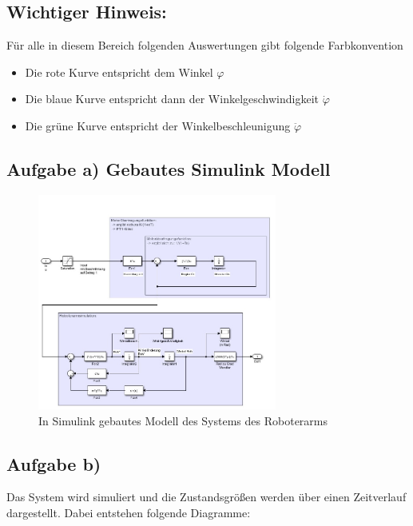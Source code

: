 \documentclass[10pt]{scrartcl}
\begin{document}
\subsection{Wichtiger Hinweis:}
Für alle in diesem Bereich folgenden Auswertungen gibt folgende Farbkonvention
\begin{itemize}
\item Die rote Kurve entspricht dem Winkel $\varphi$
\item Die blaue Kurve entspricht dann der Winkelgeschwindigkeit $\dot \varphi$
\item Die grüne Kurve entspricht der Winkelbeschleunigung  $ \ddot \varphi$
\end{itemize}


\subsection{Aufgabe a) Gebautes Simulink Modell}
\begin{figure}[H]
	\centering
	\includegraphics[width=0.7\textwidth]{Theoretischer Teil/SimulinkModell.jpeg}
	\caption{In Simulink gebautes Modell des Systems des Roboterarms}
	\label{img:grafik-dummy}
\end{figure}

\newpage
\subsection{Aufgabe b)}
Das System wird simuliert und die Zustandsgrößen werden über einen Zeitverlauf dargestellt. Dabei entstehen folgende Diagramme:
\end{document}
